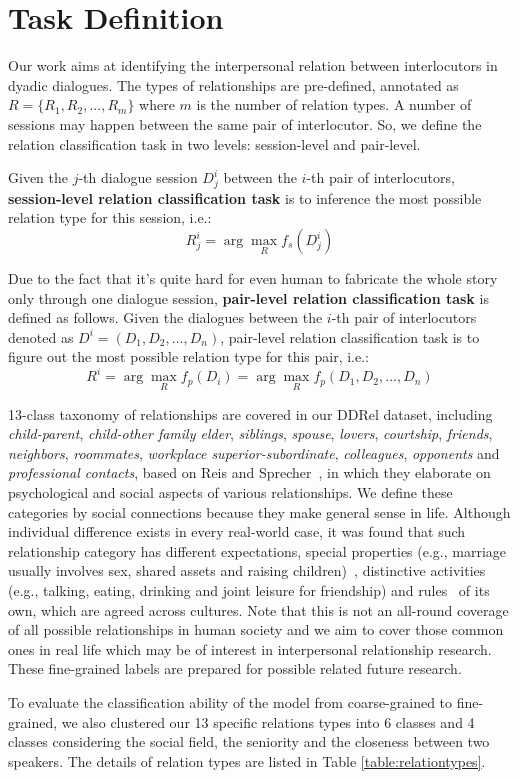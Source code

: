 \section{Task Definition}
\label{sec:task}

Our work aims at identifying the interpersonal relation between interlocutors in dyadic dialogues. 
The types of relationships are pre-defined, annotated as $R=\{R_1, R_2, ..., R_m\}$ where $m$ is the number of relation types.
A number of sessions may happen between the same pair of interlocutor. So, we define the relation classification task in two levels: session-level and pair-level.

Given the $j$-th dialogue session $D_j^i$ between the $i$-th pair of interlocutors,  \textbf{session-level relation classification task} is to inference the most possible relation type for this session, i.e.:
\begin{equation}
R_j^i = \arg\max_{R} f_s(D_j^i)
\end{equation}

Due to the fact that it's quite hard for even human to fabricate the whole story only through one dialogue session, \textbf{pair-level relation classification task} is defined as follows. Given the dialogues between the $i$-th pair of interlocutors denoted as $D^i=(D_1, D_2, ..., D_n)$, pair-level relation classification task is to figure out the most possible relation type for this pair, i.e.:
\begin{equation}
R^i = \arg\max_{R}f_p(D_i) = \arg\max_{R}f_p(D_1, D_2, ..., D_n)
\end{equation}


13-class taxonomy of relationships are covered in our DDRel dataset, 
including {\em child-parent}, {\em child-other family elder}, {\em siblings}, {\em spouse}, {\em lovers}, {\em courtship}, {\em friends}, {\em neighbors}, {\em roommates}, 
{\em workplace superior-subordinate}, {\em colleagues}, {\em opponents} and 
{\em professional contacts},
based on Reis and Sprecher~\cite{reis2009encyclopedia}, 
in which they elaborate on psychological 
and social aspects of various relationships. 
We define these categories by social connections because they make general 
sense in life. Although individual difference exists 
in every real-world case, it was found that such relationship category 
has different expectations, 
special properties (e.g., marriage usually involves sex, 
shared assets and raising children)~\cite{argyle1983sources}, 
distinctive activities (e.g., talking, eating, drinking and 
joint leisure for friendship) and 
rules~\cite{argyle1984rules} of its own, which are agreed across cultures.
Note that this is not an all-round coverage of 
all possible relationships in human society 
and we aim to cover those common
ones in real life which may be of interest in interpersonal 
relationship research.
These fine-grained labels are prepared for possible related future research.


To evaluate the classification ability of the model from coarse-grained to fine-grained, we also clustered our 13 specific 
relations types into 6 classes and 4 classes considering the social field, the seniority 
and the closeness between two speakers. The details of relation types are listed
in Table \ref{table:relationtypes}.